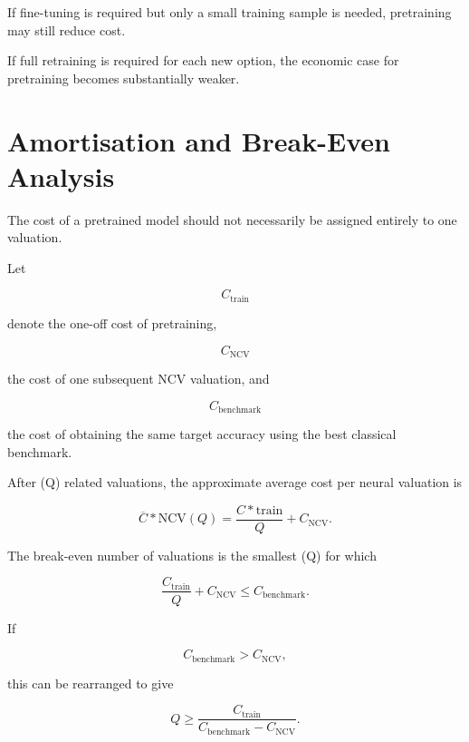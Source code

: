 \documentclass[12pt,a4paper]{report}
\begin{document}
If fine-tuning is required but only a small training sample is needed, pretraining may still reduce cost.

If full retraining is required for each new option, the economic case for pretraining becomes substantially weaker.

\section{Amortisation and Break-Even Analysis}

The cost of a pretrained model should not necessarily be assigned entirely to one valuation.

Let

\begin{equation}
C_{\mathrm{train}}
\end{equation}

denote the one-off cost of pretraining,

\begin{equation}
C_{\mathrm{NCV}}
\end{equation}

the cost of one subsequent NCV valuation, and

\begin{equation}
C_{\mathrm{benchmark}}
\end{equation}

the cost of obtaining the same target accuracy using the best classical benchmark.

After (Q) related valuations, the approximate average cost per neural valuation is

\begin{equation}
\overline{C}*{\mathrm{NCV}}(Q)
=
\frac{
C*{\mathrm{train}}
}{
Q
}
+
C_{\mathrm{NCV}}.
\end{equation}

The break-even number of valuations is the smallest (Q) for which

\begin{equation}
\frac{
C_{\mathrm{train}}
}{
Q
}
+
C_{\mathrm{NCV}}
\leq
C_{\mathrm{benchmark}}.
\end{equation}

If

\begin{equation}
C_{\mathrm{benchmark}}
>
C_{\mathrm{NCV}},
\end{equation}

this can be rearranged to give

\begin{equation}
Q
\geq
\frac{
C_{\mathrm{train}}
}{
C_{\mathrm{benchmark}}
-
C_{\mathrm{NCV}}
}.
\end{equation}
\end{document}
